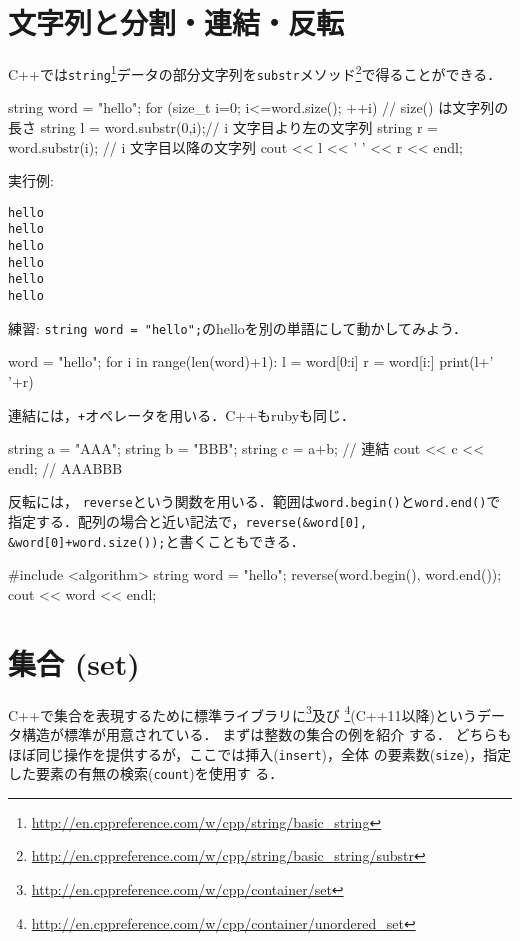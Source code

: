 \section{文字列と分割・連結・反転}
C++では\texttt{string}\footnote{\url{http://en.cppreference.com/w/cpp/string/basic_string}}データの部分文字列を\texttt{substr}メソッド\footnote{\url{http://en.cppreference.com/w/cpp/string/basic_string/substr}}で得ることができる．
\begin{cbox}
  string word = "hello";
  for (size_t i=0; i<=word.size(); ++i) { // size() は文字列の長さ
    string l = word.substr(0,i);// i 文字目より左の文字列
    string r = word.substr(i); // i 文字目以降の文字列
    cout << l << ' ' << r << endl;
  }
\end{cbox}

実行例:\\
\begin{alltt}
 hello
h ello
he llo
hel lo
hell o
hello 
\end{alltt}

練習: \texttt{string word = "hello";}のhelloを別の単語にして動かしてみよう．

\begin{pybox}
word = "hello";
for i in range(len(word)+1):
    l = word[0:i]
    r = word[i:]
    print(l+' '+r)  
\end{pybox}

連結には，\texttt{+}オペレータを用いる．C++もrubyも同じ．

\begin{cbox}
    string a = "AAA";
    string b = "BBB";
    string c = a+b; // 連結
    cout << c << endl; // AAABBB
\end{cbox}

 反転には，
\texttt{reverse}という関数を用いる．範囲は\texttt{word.begin()}と\texttt{word.end()}で指定する．配列の場合と近い記法で，\texttt{reverse(\&word[0], \&word[0]+word.size());}と書くこともできる．
 
\begin{cbox}
#include <algorithm>
    string word = "hello";
    reverse(word.begin(), word.end());
    cout << word << endl;  
\end{cbox}

\section{集合 (set)}

C++で集合を表現するために標準ライブラリに\footnote{\url{http://en.cppreference.com/w/cpp/container/set}}及び
\footnote{\url{http://en.cppreference.com/w/cpp/container/unordered_set}}(C++11以降)というデータ構造が標準が用意されている．
まずは整数の集合の例を紹介
する．
どちらもほぼ同じ操作を提供するが，ここでは挿入(\texttt{insert})，全体
の要素数(\texttt{size})，指定した要素の有無の検索(\texttt{count})を使用す
る．

